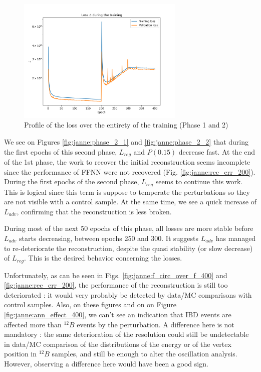 \documentclass[../main.tex]{subfiles}
\begin{document}
\begin{figure}[ht]
  \centering
  \includegraphics[height=6cm]{images/janne/training/phase_all_l.png}
  \caption{Profile of the loss over the entirety of the training (Phase 1 and 2)}
  \label{fig:janne:phase_all}
\end{figure}


We see on Figures \ref{fig:janne:phase_2_1} and \ref{fig:janne:phase_2_2} that during the first epochs of this second phase, $L_{reg}$ and $P(0.15)$ decrease fast. At the end of the 1st phase, the
work to recover the initial reconstruction seems incomplete since the performance of FFNN were not recovered (Fig. \ref{fig:janne:rec_err_200}). During the first epochs of the second phase, $L_{reg}$ seems to continue this work. This is logical since this term is suppose to temperate the perturbations so they are not visible with a control sample.  At the same time, we see a quick increase of $L_{adv}$, confirming that the reconstruction is less broken.

During most of the next 50 epochs of this phase, all losses are more stable before $L_{adv}$ starts decreasing, between epochs 250 and 300. It suggests $L_{adv}$  has managed to re-deteriorate the reconstruction, despite the quasi stability  (or slow decrease) of $L_{reg}$. This is the desired behavior concerning the losses.

Unfortunately, as can be seen in Figs. \ref{fig:janne:f_circ_over_f_400} and \ref{fig:janne:rec_err_200}, the performance of the reconstruction is still too deteriorated : it would very probably be detected by data/MC comparisons with control samples. Also, on these figures and on on Figure \ref{fig:janne:ann_effect_400}, we can't see an indication that IBD events are affected more than $^{12}B$ events by the perturbation. A difference here is not mandatory : the same deterioration of the resolution could still be undetectable in data/MC comparison of the distributions of the energy or of the vertex position  in $^{12}B$ samples, and still be enough to alter the oscillation analysis. However, observing a difference here would have been a good sign.
\end{document}
